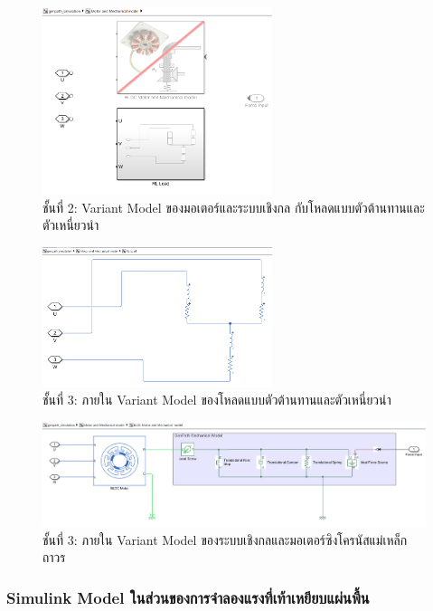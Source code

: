 \documentclass[11pt,a4paper]{article}
\begin{document}
\begin{figure}[H]
    \centering
    \includegraphics[width=0.6\textwidth]{l1-mechmodel.png}
    \caption{ชั้นที่ 2: Variant Model ของมอเตอร์และระบบเชิงกล กับโหลดแบบตัวต้านทานและตัวเหนี่ยวนำ}
\end{figure}

\begin{figure}[H]
    \centering
    \includegraphics[width=0.6\textwidth]{l2-rlload.png}
    \caption{ชั้นที่ 3: ภายใน Variant Model ของโหลดแบบตัวต้านทานและตัวเหนี่ยวนำ}
\end{figure}

\begin{figure}[H]
    \centering
    \includegraphics[width=\textwidth]{l4-genpath-bldc.png}
    \caption{ชั้นที่ 3: ภายใน Variant Model ของระบบเชิงกลและมอเตอร์ซิงโครนัสแม่เหล็กถาวร}
\end{figure}

\subsubsection{Simulink Model ในส่วนของการจำลองแรงที่เท้าเหยียบแผ่นพื้น}
\end{document}
